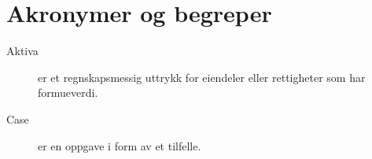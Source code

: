 \chapter*{Akronymer og begreper}
\label{kap:akronymer}

\begin{description}
    \item[Aktiva] er et regnskapsmessig uttrykk for eiendeler eller rettigheter som har formueverdi.
    \item[Case] er en oppgave i form av et tilfelle.
\end{description}